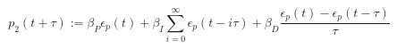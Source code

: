 \begin{equation}
	p_2(t+\tau) := \beta_P \epsilon_{p}(t) + \beta_I \sum_{i=0}^\infty \epsilon_{p}(t-i\tau) + \beta_D \frac{\epsilon_{p}(t)-\epsilon_{p}(t-\tau)}{\tau}
	\label{ch2:equ:corrective-component-power}
\end{equation}